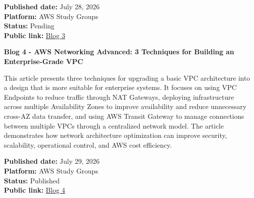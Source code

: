 \textbf{Published date:} July 28, 2026\\
\textbf{Platform:} AWS Study Groups\\
\textbf{Status:} Pending\\
\textbf{Public link:}
\href{https://www.facebook.com/groups/awsstudygroupfcj/permalink/2227122848052675/\#}{Blog
3}

\vspace{0.5em}\noindent\textbf{Blog 4 - AWS Networking Advanced: 3 Techniques for
Building an Enterprise-Grade
VPC}\par

This article presents three techniques for upgrading a basic VPC
architecture into a design that is more suitable for enterprise systems.
It focuses on using VPC Endpoints to reduce traffic through NAT
Gateways, deploying infrastructure across multiple Availability Zones to
improve availability and reduce unnecessary cross-AZ data transfer, and
using AWS Transit Gateway to manage connections between multiple VPCs
through a centralized network model. The article demonstrates how
network architecture optimization can improve security, scalability,
operational control, and AWS cost efficiency.

\textbf{Published date:} July 29, 2026\\
\textbf{Platform:} AWS Study Groups\\
\textbf{Status:} Published\\
\textbf{Public link:}
\href{https://www.facebook.com/groups/awsstudygroupfcj/permalink/2225997548165205/\#}{Blog
4}
